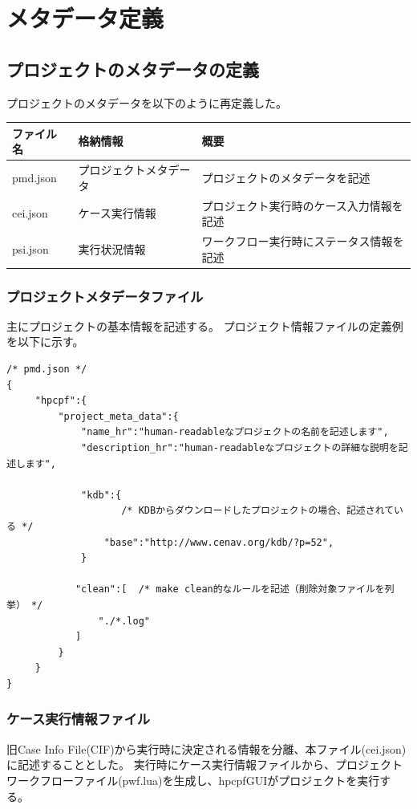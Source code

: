 \documentclass[a4paper,10pt,oneside]{jsbook}
\begin{document}
\section{メタデータ定義}

\subsection{プロジェクトのメタデータの定義}
プロジェクトのメタデータを以下のように再定義した。

\begin{table}[htb]
	\begin{tabular}{|l|l|l|} \hline
		ファイル名 & 格納情報 & 概要 \\\hline\hline
		pmd.json & プロジェクトメタデータ & プロジェクトのメタデータを記述 \\\hline
		cei.json   & ケース実行情報  & プロジェクト実行時のケース入力情報を記述 \\\hline
		psi.json   & 実行状況情報 & ワークフロー実行時にステータス情報を記述 \\\hline
	\end{tabular}
\end{table}

\subsubsection{プロジェクトメタデータファイル}
主にプロジェクトの基本情報を記述する。
プロジェクト情報ファイルの定義例を以下に示す。
\begin{verbatim}
/* pmd.json */
{
     "hpcpf":{
         "project_meta_data":{
             "name_hr":"human-readableなプロジェクトの名前を記述します",
             "description_hr":"human-readableなプロジェクトの詳細な説明を記述します",

             "kdb":{
             	    /* KDBからダウンロードしたプロジェクトの場合、記述されている */
                 "base":"http://www.cenav.org/kdb/?p=52",
             }

            "clean":[  /* make clean的なルールを記述（削除対象ファイルを列挙） */
                "./*.log" 
            ]
         }
     }
}
\end{verbatim}

\subsubsection{ケース実行情報ファイル}

旧Case Info File(CIF)から実行時に決定される情報を分離、本ファイル(cei.json)に記述することとした。
実行時にケース実行情報ファイルから、プロジェクトワークフローファイル(pwf.lua)を生成し、hpcpfGUIがプロジェクトを実行する。
\end{document}

